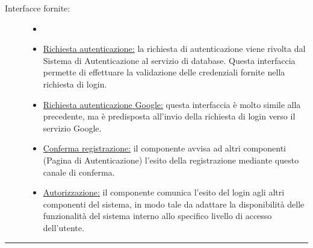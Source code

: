 \documentclass[11pt, a4paper]{article}
\theoremstyle{definition} %
\begin{document}
\begin{description}
    \item[Interfacce fornite:]
    \begin{itemize}
        \item[]

        \item \underline{Richiesta autenticazione:} la richiesta di
        autenticazione viene rivolta dal Sistema di Autenticazione
        al servizio di database. Questa interfaccia permette di effettuare
        la validazione delle credenziali fornite nella richiesta di
        login.

        \item \underline{Richiesta autenticazione Google:} questa
        interfaccia è molto simile alla precedente, ma è predisposta
        all'invio della richiesta di login verso il servizio Google.

        \item \underline{Conferma registrazione:} il componente avvisa
        ad altri componenti (Pagina di Autenticazione) l'esito della
        registrazione mediante questo canale di conferma.

        \item \underline{Autorizzazione:} il componente comunica
        l'esito del login agli altri componenti del sistema, in modo
        tale da adattare la disponibilità delle funzionalità del sistema
        interno allo specifico livello di accesso dell'utente.
    \end{itemize}
\end{description}

\begin{center}
    \rule{5cm}{1pt}
\end{center}
\end{document}

